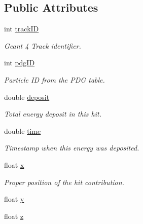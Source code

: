 \subsection*{Public Attributes}
\begin{DoxyCompactItemize}
\item 
int \hyperlink{class_d_d4hep_1_1_simulation_1_1_geant4_hit_data_1_1_monte_carlo_contrib_a80a8546851d931b3b39e690a3bc1b3d8}{trackID}
\begin{DoxyCompactList}\small\item\em Geant 4 Track identifier. \item\end{DoxyCompactList}\item 
int \hyperlink{class_d_d4hep_1_1_simulation_1_1_geant4_hit_data_1_1_monte_carlo_contrib_a7b755dfa6639f3cc02cd4696719d0580}{pdgID}
\begin{DoxyCompactList}\small\item\em Particle ID from the PDG table. \item\end{DoxyCompactList}\item 
double \hyperlink{class_d_d4hep_1_1_simulation_1_1_geant4_hit_data_1_1_monte_carlo_contrib_a34177a48fce1f52d1b58d6ab47e1cacc}{deposit}
\begin{DoxyCompactList}\small\item\em Total energy deposit in this hit. \item\end{DoxyCompactList}\item 
double \hyperlink{class_d_d4hep_1_1_simulation_1_1_geant4_hit_data_1_1_monte_carlo_contrib_a2d1cbbdb9da1af65acb58ef97fe10277}{time}
\begin{DoxyCompactList}\small\item\em Timestamp when this energy was deposited. \item\end{DoxyCompactList}\item 
float \hyperlink{class_d_d4hep_1_1_simulation_1_1_geant4_hit_data_1_1_monte_carlo_contrib_af10634172fe6990ae8f588ba109c1c0f}{x}
\begin{DoxyCompactList}\small\item\em Proper position of the hit contribution. \item\end{DoxyCompactList}\item 
float \hyperlink{class_d_d4hep_1_1_simulation_1_1_geant4_hit_data_1_1_monte_carlo_contrib_afc4f5cb38a61ece64df14416ae637cbb}{y}
\item 
float \hyperlink{class_d_d4hep_1_1_simulation_1_1_geant4_hit_data_1_1_monte_carlo_contrib_ad56f9cc8b369b718c9f85a17bfe43054}{z}
\end{DoxyCompactItemize}


